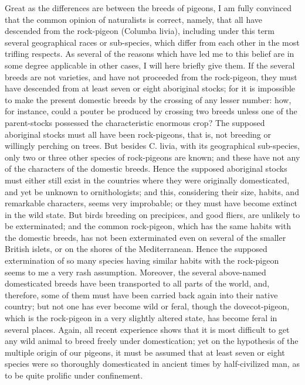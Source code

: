 \documentclass{book}
\begin{document}
Great as the differences are between the breeds of pigeons, I am fully
convinced that the common opinion of naturalists is correct, namely, that all
have descended from the rock-pigeon (Columba livia), including under this term
several geographical races or sub-species, which differ from each other in the
most trifling respects. As several of the reasons which have led me to this
belief are in some degree applicable in other cases, I will here briefly give
them. If the several breeds are not varieties, and have not proceeded from the
rock-pigeon, they must have descended from at least seven or eight aboriginal
stocks; for it is impossible to make the present domestic breeds by the
crossing of any lesser number: how, for instance, could a pouter be produced by
crossing two breeds unless one of the parent-stocks possessed the
characteristic enormous crop? The supposed aboriginal stocks must all have been
rock-pigeons, that is, not breeding or willingly perching on trees. But besides
C. livia, with its geographical sub-species, only two or three other species of
rock-pigeons are known; and these have not any of the characters of the
domestic breeds. Hence the supposed aboriginal stocks must either still exist
in the countries where they were originally domesticated, and yet be unknown to
ornithologists; and this, considering their size, habits, and remarkable
characters, seems very improbable; or they must have become extinct in the wild
state. But birds breeding on precipices, and good fliers, are unlikely to be
exterminated; and the common rock-pigeon, which has the same habits with the
domestic breeds, has not been exterminated
even on several of the smaller British islets, or on the shores of the
Mediterranean. Hence the supposed extermination of so many species having
similar habits with the rock-pigeon seems to me a very rash assumption.
Moreover, the several above-named domesticated breeds have been transported to
all parts of the world, and, therefore, some of them must have been carried
back again into their native country; but not one has ever become wild or
feral, though the dovecot-pigeon, which is the rock-pigeon in a very slightly
altered state, has become feral in several places. Again, all recent experience
shows that it is most difficult to get any wild animal to breed freely under
domestication; yet on the hypothesis of the multiple origin of our pigeons, it
must be assumed that at least seven or eight species were so thoroughly
domesticated in ancient times by half-civilized man, as to be quite prolific
under confinement.
\end{document}
